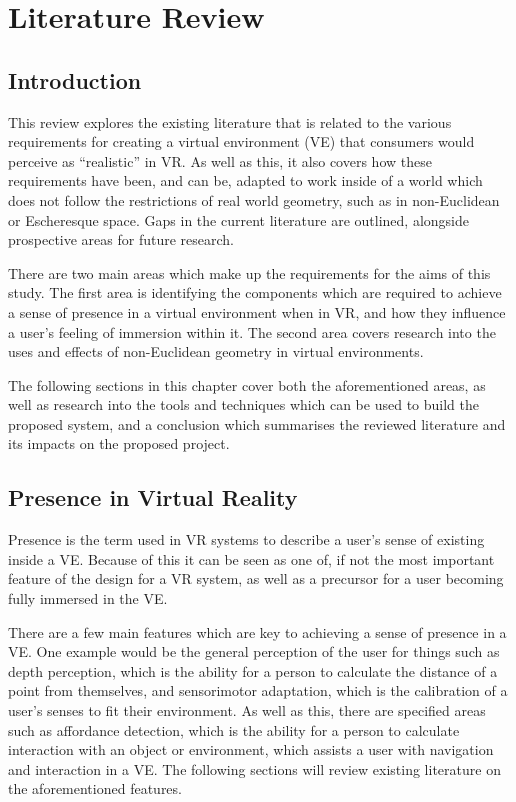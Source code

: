 \chapter{Literature Review}
\label{lr}

	\section{Introduction}
	\label{lr:intro}

		This review explores the existing literature that is related to the various requirements for creating a virtual environment (VE) that consumers would perceive as \enquote{realistic} in VR.
		As well as this, it also covers how these requirements have been, and can be, adapted to work inside of a world which does not follow the restrictions of real world geometry, such as in non-Euclidean or Escheresque space.
		Gaps in the current literature are outlined, alongside prospective areas for future research.

		There are two main areas which make up the requirements for the aims of this study.
		The first area is identifying the components which are required to achieve a sense of presence in a virtual environment when in VR, and how they influence a user's feeling of immersion within it.
		The second area covers research into the uses and effects of non-Euclidean geometry in virtual environments.

		The following sections in this chapter cover both the aforementioned areas, as well as research into the tools and techniques which can be used to build the proposed system, and a conclusion which summarises the reviewed literature and its impacts on the proposed project.

	\section{Presence in Virtual Reality}
	\label{lr:vr}

		Presence is the term used in VR systems to describe a user's sense of existing inside a VE. Because of this it can be seen as one of, if not the most important feature of the design for a VR system, as well as a precursor for a user becoming fully immersed in the VE.

		There are a few main features which are key to achieving a sense of presence in a VE. One example would be the general perception of the user for things such as depth perception, which is the ability for a person to calculate the distance of a point from themselves, and sensorimotor adaptation, which is the calibration of a user's senses to fit their environment.
		As well as this, there are specified areas such as affordance detection, which is the ability for a person to calculate interaction with an object or environment, which assists a user with navigation and interaction in a VE.
		The following sections will review existing literature on the aforementioned features.

